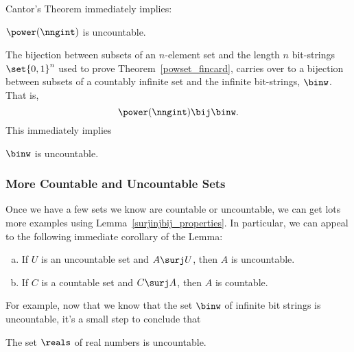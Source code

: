 Cantor's Theorem immediately implies:

\begin{corollary}
$\power(\nngint)$ is uncountable.
\end{corollary}

The bijection between subsets of an $n$-element set and the length $n$
bit-strings $\set{0,1}^n$ used to prove
Theorem~\ref{powset_fincard}, carries over to a bijection between
subsets of a countably infinite set and the infinite bit-strings,
$\binw$.  That is,
\[
\power(\nngint) \bij \binw.
\]
This immediately implies
\begin{corollary}
$\binw$ is uncountable.
\end{corollary}

\subsubsection{More Countable and Uncountable Sets}

Once we have a few sets we know are countable or uncountable, we can
get lots more examples using Lemma~\ref{surjinjbij_properties}.  In particular, 
we can appeal to the following immediate corollary of the Lemma:
\noindent \begin{corollary}\label{UinjAu}
\mbox{}
\begin{enumerate}[(a)]

\item\label{AsurjUA}
If $U$ is an uncountable set and $A \surj U$, then $A$ is uncountable.

\item\label{CsurjAc}
If $C$ is a countable set and $C \surj A$, then $A$ is countable.
\end{enumerate}
\end{corollary}

For example, now that we know that the set $\binw$ of infinite bit
strings is uncountable, it's a small step to conclude that
\begin{corollary}\label{uncountR}
The set $\reals$ of real numbers is uncountable.
\end{corollary}

